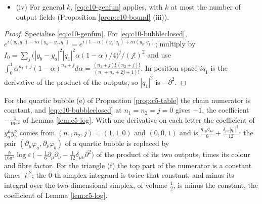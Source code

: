 \begin{proposition}[Explicit forms for $k=0,1,2$]
\begin{itemize}
\[\begin{aligned}
16\pi^2\big(\text{coefficient of }\log\varepsilon\big)&=e^{i(y_b,q_2)}\,(\text{chain numerator})\int e^{i(y_b-y_a,\,\text{centre})}\sum_{i\ge0}\frac{(|y_b-y_a|^2/4)^{i+1}(\text{momentum form})^i}{i!\,(i+1)!}\,d\alpha,\\
16\pi^2\big(\text{coefficient of }\varepsilon^{-m}\big)&=\frac{(-1)^{m+1}}m\,e^{i(y_b,q_2)}\,(\text{chain numerator})\int\big(\min_e\alpha_e\big)^me^{i(y_b-y_a,\,\text{centre})}\sum_{i\ge0}\frac{(|y_b-y_a|^2/4)^{i+m+1}(\text{momentum form})^i}{i!\,(i+m+1)!}\,d\alpha,
\end{aligned}
\]
with $\int\alpha_0^{n_0}\alpha_1^{n_1}\alpha_2^{n_2}\,d\alpha=\frac{n_0!\,n_1!\,n_2!}{(n_0+n_1+n_2+2)!}$.
\item (iv) For general $k$, \eqref{eq:c10-genfun} applies, with $k$ at most the number of output fields (Proposition \ref{prop:c10-bound} (iii)).
\end{itemize}
\end{proposition}

\begin{proof}
Specialise \eqref{eq:c10-genfun}. For \eqref{eq:c10-bubbleclosed}, $e^{i(y_b,q_1)-i\alpha(y_b-y_a,q_1)}=e^{i(1-\alpha)(y_b,q_1)+i\alpha(y_a,q_1)}$; multiply by $I_0=\sum_j\big(|y_b-y_a|^2|q_1|^2\alpha(1-\alpha)/4\big)^j/(j!)^2$ and use $\int_0^1\alpha^{n_1+j}(1-\alpha)^{n_2+j}d\alpha=\frac{(n_1+j)!\,(n_2+j)!}{(n_1+n_2+2j+1)!}$. In position space $iq_1$ is the derivative of the product of the outputs, so $|q_1|^2$ is $-\partial^2$.
\end{proof}

\begin{example}
\label{ex:c10-closed}
For the quartic bubble (e) of Proposition \ref{prop:c5-table} the chain numerator is constant, and \eqref{eq:c10-bubbleclosed} at $n_1=n_2=j=0$ gives $-1$, the coefficient $-\frac1{16\pi^2}$ of Lemma \ref{lem:c5-log}. With one derivative on each letter the coefficient of $y_a^\mu y_b^\nu$ comes from $(n_1,n_2,j)=(1,1,0)$ and $(0,0,1)$ and is $\frac{q_{1\mu}q_{1\nu}}6+\frac{\delta_{\mu\nu}|q_1|^2}{12}$: the pair $(\partial_\mu\varphi_a,\partial_\nu\varphi_b)$ of a quartic bubble is replaced by $\frac{\hbar}{16\pi^2}\log\varepsilon\,\big(-\tfrac16\partial_\mu\partial_\nu-\tfrac1{12}\delta_{\mu\nu}\partial^2\big)$ of the product of its two outputs, times its colour and fibre factor. For the triangle (f) the top part of the numerator is a constant times $|l|^2$; the $0$-th simplex integrand is twice that constant, and minus its integral over the two-dimensional simplex, of volume $\tfrac12$, is minus the constant, the coefficient of Lemma \ref{lem:c5-log}.
\end{example}

